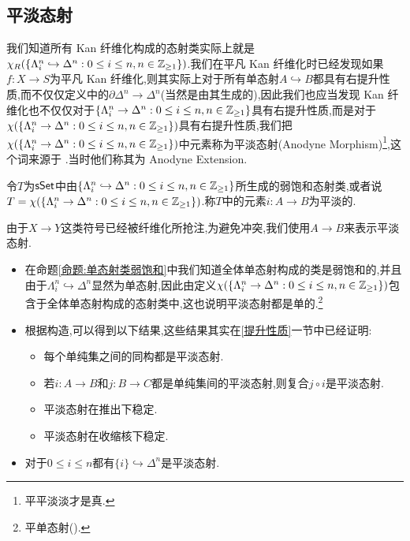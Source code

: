 \subsection{平淡态射}
我们知道所有 Kan 纤维化构成的态射类实际上就是$\chi_R(\{\Lambda_i^n \hookrightarrow \Delta^n : 0\leq i \leq n, n\in \mathbb{Z}_{\geq 1}\})$.我们在平凡 Kan 纤维化时已经发现如果$f: X \to S$为平凡 Kan 纤维化,则其实际上对于所有单态射$A\hookrightarrow B$都具有右提升性质,而不仅仅定义中的$\partial \Delta^n \to \Delta^n$(当然是由其生成的),因此我们也应当发现 Kan 纤维化也不仅仅对于$\{\Lambda_i^n \to \Delta^n : 0\leq i \leq n, n\in \mathbb{Z}_{\geq 1}\}$具有右提升性质,而是对于$\chi(\{\Lambda_i^n \to \Delta^n : 0\leq i \leq n, n\in \mathbb{Z}_{\geq 1}\})$具有右提升性质,我们把$\chi(\{\Lambda_i^n \to \Delta^n : 0\leq i \leq n, n\in \mathbb{Z}_{\geq 1}\})$中元素称为平淡态射(Anodyne Morphism)\footnote{平平淡淡才是真.},这个词来源于\parencite[Chapter IV.2]{Gabriel-Zisman67} .当时他们称其为 Anodyne Extension.
\begin{definition}[平淡态射]
    令$T$为$\mathsf{sSet}$中由$\{\Lambda_i^n \hookrightarrow \Delta^n : 0\leq i \leq n,n \in \mathbb{Z}_{\geq 1}\}$所生成的弱饱和态射类,或者说$T = \chi(\{\Lambda_i^n \to \Delta^n : 0\leq i \leq n, n\in \mathbb{Z}_{\geq 1}\})$.称$T$中的元素$i : A\to B$为平淡的.
\end{definition}
由于$X \to Y$这类符号已经被纤维化所抢注,为避免冲突,我们使用$A \to B$来表示平淡态射.
\begin{remark}
    \begin{itemize}
        \item 在命题\ref{命题:单态射类弱饱和}中我们知道全体单态射构成的类是弱饱和的,并且由于$\Lambda_i^n \hookrightarrow \Delta^n$显然为单态射,因此由定义$\chi(\{\Lambda_i^n \to \Delta^n : 0\leq i \leq n, n\in \mathbb{Z}_{\geq 1}\})$包含于全体单态射构成的态射类中,这也说明平淡态射都是单的.\footnote{平单态射().}
        \item 根据构造,可以得到以下结果,这些结果其实在\ref{提升性质}一节中已经证明:
        \begin{itemize}
            \item 每个单纯集之间的同构都是平淡态射.
            \item 若$i: A \to B$和$j:B \to C$都是单纯集间的平淡态射,则复合$j\circ i$是平淡态射.
            \item 平淡态射在推出下稳定.
            \item 平淡态射在收缩核下稳定.
        \end{itemize}
        \item 对于$0\leq i \leq n$都有$\{i\} \hookrightarrow \Delta^n$是平淡态射.
    \end{itemize}
\end{remark}

